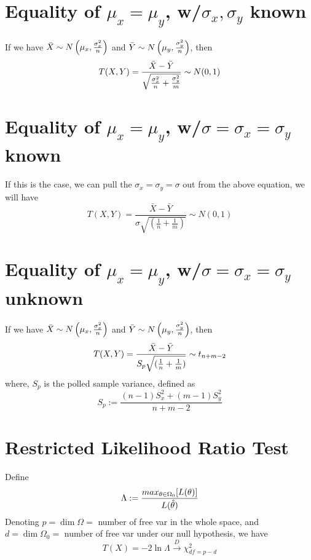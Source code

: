 \documentclass{article}
\begin{document}
\section{Equality of $\mu_x = \mu_y$, w/$\sigma_x, \sigma_y$ known}
If we have $\Bar{X} \sim N\left( \mu_x, \frac{\sigma_x^2}{n} \right)$ 
and $\Bar{Y} \sim N\left( \mu_y, \frac{\sigma_y^2}{n} \right)$, then 
\begin{equation*}
    T(X,Y) = \frac{\Bar{X} - \Bar{Y}}{\sqrt{\frac{\sigma_x^2}{n} + 
\frac{\sigma_y^2}{m}}}\sim N(0, 1)
\end{equation*}

\section{Equality of $\mu_x = \mu_y$, w/$\sigma=\sigma_x=\sigma_y$ 
known}
If this is the case, we can pull the $\sigma_x = \sigma_y = \sigma$ 
out from the above equation, we will have
\begin{equation*}
    T(X,Y) = \frac{\bar{X} - \bar{Y}}{\sigma \sqrt{(\frac{1}{n} + 
\frac{1}{m})}} \sim N(0, 1)
\end{equation*}

\section{Equality of $\mu_x = \mu_y$, w/$\sigma = \sigma_x = \sigma_y$ 
unknown}
If we have $\Bar{X} \sim N\left( \mu_x, \frac{\sigma_x^2}{n} \right)$ 
and $\Bar{Y} \sim N\left( \mu_y, \frac{\sigma_y^2}{n} \right)$, then 
\begin{equation*}
    T(X,Y) = \frac{\Bar{X} - \Bar{Y}}{S_p \sqrt{(\frac{1}{n} + 
\frac{1}{m})}} \sim t_{n+m-2}
\end{equation*}
where, $S_p$ is the polled sample variance, defined as
\begin{equation*}
    S_p := \frac{(n-1)S_x^2 + (m-1)S_y^2}{n+m-2}
\end{equation*}

\section{Restricted Likelihood Ratio Test}
Define
\begin{equation*}
    \Lambda := \frac{max_{\theta \in 
\Omega_0}[L(\theta)]}{L(\Hat{\theta})}
\end{equation*}
Denoting $p = \dim\Omega =$ number of free var in the whole space, and 
$d = \dim\Omega_0 =$ number of free var under our null hypothesis, we 
have
\begin{equation*}
    T(X) = -2\ln{\Lambda} \xrightarrow{D} \chi^2_{df = p-d}
\end{equation*}
\end{document}
